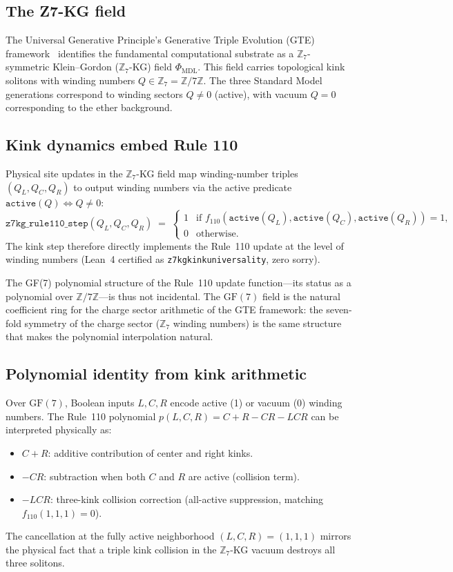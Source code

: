 \documentclass[11pt]{article}
\theoremstyle{remark}
\newcommand{\lean}[1]{%
  \penalty-100
  \begingroup\def\_{\textunderscore\allowbreak}\texttt{#1}\endgroup}
\begin{document}
\subsection{The Z7-KG field}

The Universal Generative Principle's Generative Triple Evolution (GTE) framework~\cite{SpivackCompUniversality,SpivackGTEMobius} identifies the fundamental computational substrate as a $\mathbb{Z}_7$-symmetric Klein--Gordon ($\mathbb{Z}_7$-KG) field $\Phi_{\mathrm{MDL}}$.
This field carries topological kink solitons with winding numbers $Q \in \mathbb{Z}_7 = \mathbb{Z}/7\mathbb{Z}$.
The three Standard Model generations correspond to winding sectors $Q \neq 0$ (active),
with vacuum $Q = 0$ corresponding to the ether background.

\subsection{Kink dynamics embed Rule 110}

Physical site updates in the $\mathbb{Z}_7$-KG field map winding-number triples
$(Q_L, Q_C, Q_R)$ to output winding numbers via the active predicate
$\texttt{active}(Q) \Leftrightarrow Q \neq 0$:
\[
  \texttt{z7kg\_rule110\_step}(Q_L, Q_C, Q_R) \;=\;
  \begin{cases}
    1 & \text{if } f_{110}(\texttt{active}(Q_L), \texttt{active}(Q_C), \texttt{active}(Q_R)) = 1,\\
    0 & \text{otherwise.}
  \end{cases}
\]
The kink step therefore directly implements the Rule~110 update at the level of winding
numbers (Lean~4 certified as \lean{z7kg\_kink\_universality}, zero sorry).

The GF(7) polynomial structure of the Rule~110 update function---its status as a
polynomial over $\mathbb{Z}/7\mathbb{Z}$---is thus not incidental.
The $\mathrm{GF}(7)$ field is the natural coefficient ring for the charge sector
arithmetic of the GTE framework: the seven-fold symmetry of the charge sector
($\mathbb{Z}_7$ winding numbers) is the same structure that makes the polynomial
interpolation natural.

\subsection{Polynomial identity from kink arithmetic}

Over $\mathrm{GF}(7)$, Boolean inputs $L,C,R$ encode active (1) or vacuum (0)
winding numbers.
The Rule~110 polynomial $p(L,C,R) = C + R - CR - LCR$ can be interpreted
physically as:
\begin{itemize}[itemsep=0.1em]
  \item $C + R$: additive contribution of center and right kinks.
  \item $-CR$: subtraction when both $C$ and $R$ are active (collision term).
  \item $-LCR$: three-kink collision correction (all-active suppression, matching $f_{110}(1,1,1)=0$).
\end{itemize}
The cancellation at the fully active neighborhood $(L,C,R)=(1,1,1)$ mirrors the
physical fact that a triple kink collision in the $\mathbb{Z}_7$-KG vacuum destroys
all three solitons.
\end{document}
